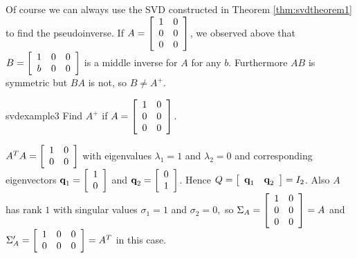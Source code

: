 Of course we can always use the SVD constructed in Theorem \ref{thm:svdtheorem1} to find the
pseudoinverse. If $A=
\left[ 
\begin{array}{cc}
1 & 0 \\ 
0 & 0 \\ 
0 & 0
\end{array}
\right]$, we observed above that $B=
\left[ 
\begin{array}{ccc}
1 & 0 & 0 \\ 
b & 0 & 0
\end{array}
\right] $ is a middle inverse for $A$ for any $b$. Furthermore $AB$ is
symmetric but $BA$ is not, so $B\neq A^{+}$.

\begin{example}{}{svdexample3} 
Find $A^{+}$ if $A=
\left[ 
\begin{array}{cc}
1 & 0 \\ 
0 & 0 \\ 
0 & 0
\end{array}
\right]$.

\begin{solution} $A^{T}A=
\left[ 
\begin{array}{cc}
1 & 0 \\ 
0 & 0
\end{array}
\right] $ with eigenvalues $\lambda_{1}=1$ and $\lambda_{2}=0$ and
corresponding eigenvectors $\textbf{q}_{1}=
\left[ 
\begin{array}{c}
1 \\ 
0
\end{array}
\right] $ and $\textbf{q}_{2}=
\left[ 
\begin{array}{c}
0 \\ 
1
\end{array}
\right]$. Hence $Q=\left[ \begin{array}{cc}\textbf{q}_{1}&\textbf{q}_{2}\end{array}\right]=I_{2}$. Also $A$ has
rank $1$ with singular values $\sigma_{1}=1$ and $\sigma_{2}=0,$ so $\Sigma_{A}=
\left[ 
\begin{array}{cc}
1 & 0 \\ 
0 & 0 \\ 
0 & 0
\end{array}
\right]=A$ and $\Sigma^{\prime}_{A}=
\left[ 
\begin{array}{ccc}
1 & 0 & 0 \\ 
0 & 0 & 0
\end{array}
\right]=A^{T}$ in this case.


\end{solution}
\end{example}
